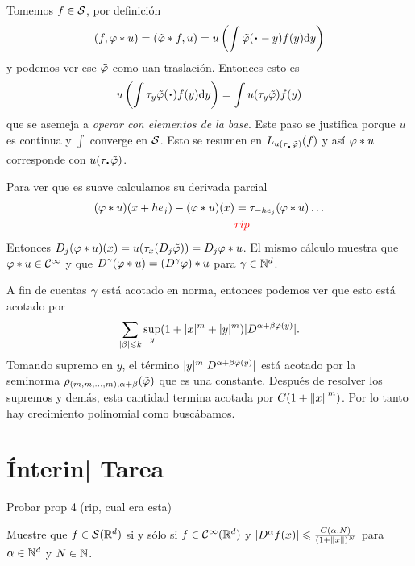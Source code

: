 \documentclass[12pt]{memoir}
\begin{document}
\begin{ptcbp}
  Tomemos $f\in\mathcal{S}$, por definición 
  $$(f,\vf\ast u)=(\tilde{\vf}\ast f,u)=u\left(\int\tilde\vf(\.-y)f(y)\dd y\right)$$
  y podemos ver ese $\tilde{\varphi}$ como uan traslación. Entonces esto es 
  $$u\left(\int\tau_y\tilde{\vf}(\.)f(y)\dd y\right)=\int u(\tau_y\tilde{\vf})f(y)$$
  que se asemeja a \emph{operar con elementos de la base}. Este paso se justifica porque $u$ es continua y $\int$ converge en $\mathcal{S}$. Esto se resumen en $L_{u(\tau_{\.}\tilde{\vf})}(f)$ y así $\varphi\ast u$ corresponde con $u(\tau_{\.} \tilde{\vf})$.\par 
  Para ver que es suave calculamos su derivada parcial
  \begin{align*}
    (\varphi\ast u)(x+he_j)-(\varphi\ast u)(x)&=\tau_{-he_j}(\varphi\ast u)\dots\\
    & \textcolor{red}{rip}
  \end{align*}
  Entonces $D_j(\varphi\ast u)(x)=u(\tau_x(D_j\tilde{\varphi}))=D_j\varphi\ast u$. El mismo cálculo muestra que $\varphi\ast u\in\mathcal{C}^\infty$ y que $D^\gamma(\varphi\ast u)=(D^\gamma\varphi)\ast u$ para $\gamma\in\mathbb{N}^d$. \par 
  \par 

A fin de cuentas $\gamma$ está acotado en norma, entonces podemos ver que esto está acotado por
$$\sum_{|\beta|\leqslant k}\sup_y(1+|x|^m+|y|^m)|D^{\alpha+\beta\tilde{\varphi}(y)}|.$$
Tomando supremo en $y$, el término $|y|^m|D^{\alpha+\beta\tilde{\varphi}(y)}|$ está acotado por la seminorma $\rho_{(m,m,\dots,m),\alpha+\beta}(\tilde{\varphi})$ que es una constante. Después de resolver los supremos y demás, esta cantidad termina acotada por $C(1+\left\|x\right\|^m)$. Por lo tanto hay crecimiento polinomial como buscábamos.\par 
{}
\end{ptcbp}


\section{Ínterin| Tarea}

\begin{Ej}
  Probar prop 4 (rip, cual era esta)
  \end{Ej}

\begin{Ej}
 Muestre que $f\in\mathcal{S}(\mathbb{R}^d)$ si y sólo si $f\in\mathcal{C}^\infty(\mathbb{R}^d)$ y $|D^\alpha f(x)|\leqslant \frac{C(\alpha,N)}{(1+\left\|x\right\|)^N}$ para $\alpha\in\mathbb{N}^d$ y $N\in\mathbb{N}$.
\end{Ej}
\end{document}
